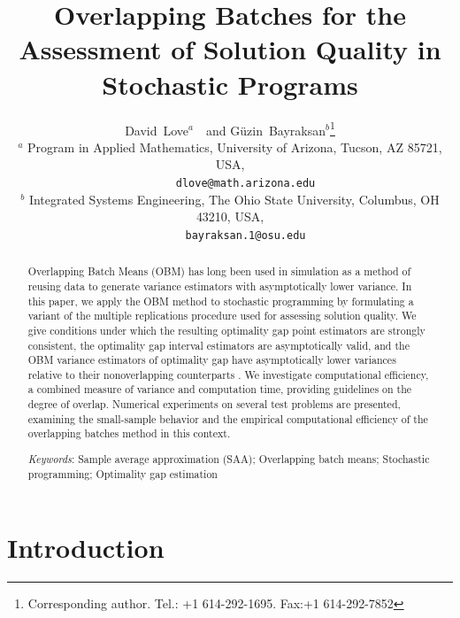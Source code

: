 \documentclass[12pt]{article}
\newcommand{\Keywords}[1]{\par\noindent 
{\small{\em Keywords\/}: #1}}
\begin{document}
\title{Overlapping Batches for the Assessment of Solution Quality in Stochastic Programs}

\author{David~Love$^{a}$\ \ and G\"{u}zin~Bayraksan$^{b}$\thanks{Corresponding author. Tel.: +1 614-292-1695. Fax:+1 614-292-7852}\\[6pt]
{\small
      $^{a}$ Program in Applied Mathematics, University of Arizona, Tucson, AZ 85721, USA,}\\
{\small \ \ \ \ \ \texttt{dlove@math.arizona.edu}} \\
{\small 
      $^{b}$ Integrated Systems Engineering, The Ohio State University, Columbus, OH 43210, USA,}\\
{\small \ \ \ \  \   \texttt{bayraksan.1@osu.edu}}}
\date{}

\maketitle

\begin{abstract}
\noindent Overlapping Batch Means (OBM) has long been used in simulation as a method of reusing data to generate variance estimators with asymptotically lower variance.
In this paper, we apply the OBM method to stochastic programming by formulating a variant of the multiple replications procedure used for assessing solution quality.
We give conditions under which the resulting optimality gap point estimators are strongly consistent, the optimality gap interval estimators are asymptotically valid, and the OBM variance estimators of optimality gap have asymptotically lower variances relative to their nonoverlapping counterparts \citep{Meketon1984,Welch1987}.
We investigate computational efficiency, a combined measure of variance and computation time, providing guidelines on the degree of overlap.  
Numerical experiments on several test problems are presented, examining the small-sample behavior and the empirical computational efficiency of the overlapping batches method in this context.  
\medskip

\Keywords{Sample average approximation (SAA); Overlapping batch means;   Stochastic programming; Optimality gap estimation}
\end{abstract}


\section{Introduction}
\label{sec:intro}
\end{document}
